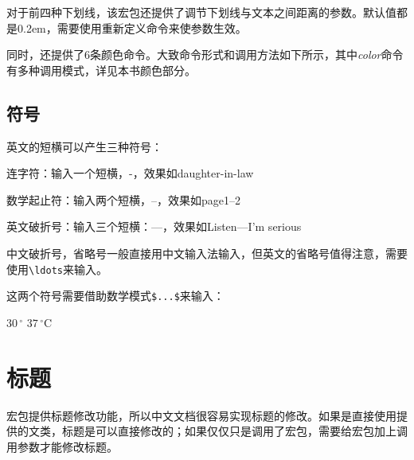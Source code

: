 对于前四种下划线，该宏包还提供了调节下划线与文本之间距离的参数。默认值都是0.2em，需要使用重新定义命令来使参数生效。

\begin{latex}
\CJKunderdotbasesep
\CJKunderlinebasesep
\CJKunderdbllinebasesep
\CJKunderwavebasesep
\renewcommand{\CJKunderlinebasesep}{0.5em}
\end{latex}

同时，还提供了6条颜色命令。大致命令形式和调用方法如下所示，其中\emph{color}命令有多种调用模式，详见本书颜色部分。

\begin{latex}
\CJKunderlinecolor
\renewcommand{\CJKunderline}{\color{blue}}
\end{latex}

\subsection{符号}


英文的短横可以产生三种符号：\par

\begin{compactitem}[\textbullet]
    \item 连字符：输入一个短横，-，效果如daughter-in-law
    \item 数学起止符：输入两个短横，--，效果如page1--2
    \item 英文破折号：输入三个短横：---，效果如Listen---I'm serious
\end{compactitem}

中文破折号，省略号一般直接用中文输入法输入，但英文的省略号值得注意，需要使用\verb|\ldots|来输入。

这两个符号需要借助数学模式\verb|$...$|来输入：
\begin{codeshow}
    $30\,^{\circ}$
    $37\,^{\circ}\mathrm{C}$
\end{codeshow}

\section{标题}

\CTeX 宏包提供标题修改功能，所以中文文档很容易实现标题的修改。如果是直接使用\CTeX 提供的文类，标题是可以直接修改的；如果仅仅只是调用了\CTeX 宏包，需要给宏包加上调用参数才能修改标题。

\begin{latex}
\usepackage[
heading=true,%
]{ctex}
\end{latex}







